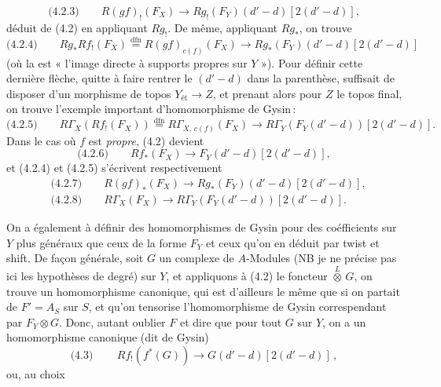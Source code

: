 \documentclass[11pt,a4paper]{article}
\begin{document}
\[
\text{(4.2.3)}\qquad R(gf)_{!}(F_X) \longrightarrow
Rg_{!}(F_Y)(d'-d)[2(d'-d)] ,
\]
déduit de (4.2) en appliquant $Rg_{!}$. De même, appliquant $Rg_{*}$, on
trouve
\[
\text{(4.2.4)}\qquad Rg_{*}Rf_{!}(F_X) \overset{\mathrm{dfn}}{=}
R(gf)_{c(f)}(F_X) \longrightarrow Rg_{*}(F_Y)(d'-d)[2(d'-d)]
\]
(où la   est « l'image directe à supports
propres sur $Y$ »).  Pour définir cette
dernière flèche, quitte à faire rentrer le $(d'-d)$ dans la parenthèse,
 suffisait de disposer d'un morphisme de  topos
$Y_{\text{ét}} \to Z$, et prenant alors pour $Z$ le topos final, on trouve
l'exemple important d'homomorphisme de Gysin\,:
\[
\text{(4.2.5)}\qquad R\Gamma_X(Rf_{!}(F_X)) \overset{\mathrm{dfn}}{=}
R\Gamma_{X,\,c(f)}(F_X) \longrightarrow R\Gamma_Y(F_Y(d'-d))[2(d'-d)] .
\]
Dans le cas où $f$ est \emph{propre}, (4.2) devient
\[
\text{(4.2.6)}\qquad Rf_{*}(F_X) \longrightarrow F_Y(d'-d)[2(d'-d)] ,
\]
et (4.2.4) et (4.2.5) s'écrivent respectivement
\[
\begin{aligned}
&\text{(4.2.7)}\qquad R(gf)_{*}(F_X) \longrightarrow Rg_{*}(F_Y)(d'-d)[2(d'-d)] ,\\
&\text{(4.2.8)}\qquad R\Gamma_X(F_X) \longrightarrow R\Gamma_Y(F_Y(d'-d))[2(d'-d)] .
\end{aligned}
\]

 On a également à définir des homomorphismes de Gysin pour des
coéfficients sur $Y$ plus généraux que ceux de la forme $F_Y$ et ceux qu'on
en déduit par twist et shift. De façon générale, soit $G$ un complexe de
$A$-Modules (NB je ne précise pas ici  les hypothèses de
degré) sur $Y$, et appliquons à (4.2) le foncteur
$\overset{L}{\otimes}\, G$, on trouve un homomorphisme canonique, qui est
d'ailleurs le même que si on partait de $F' = A_S$ sur $S$, et qu'on
tensorise l'homomorphisme de Gysin correspendant par
$F_Y \otimes G$. Donc, autant oublier $F$ et dire que pour tout $G$ sur
$Y$, on a un homomorphisme canonique (dit  de Gysin)
\[
\text{(4.3)}\qquad \boxed{\,Rf_{!}(f^{*}(G)) \longrightarrow
G(d'-d)[2(d'-d)]\,} ,
\]
ou, au choix
\end{document}
